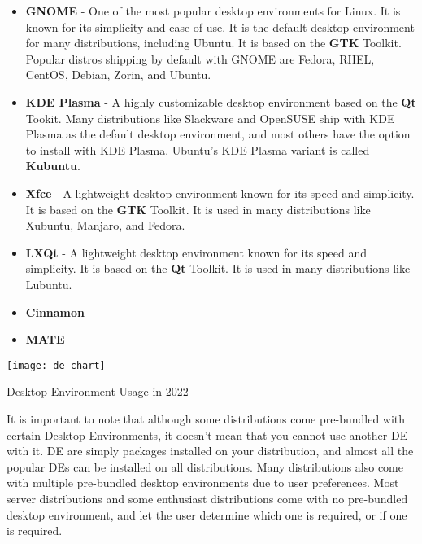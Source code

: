 \begin{itemize}
  \item
    \textbf{GNOME} - One of the most popular desktop environments for Linux. It is known for its simplicity and ease of use. It is the default desktop environment for many distributions, including Ubuntu. It is based on the \textbf{GTK} Toolkit.
    Popular distros shipping by default with GNOME are Fedora, RHEL, CentOS, Debian, Zorin, and Ubuntu.
  \item
    \textbf{KDE Plasma} - A highly customizable desktop environment based on the \textbf{Qt} Tookit.
    Many distributions like Slackware and OpenSUSE ship with KDE Plasma as the default desktop environment, and most others have the option to install with KDE Plasma. Ubuntu's KDE Plasma variant is called \textbf{Kubuntu}.
  \item
    \textbf{Xfce} - A lightweight desktop environment known for its speed and simplicity. It is based on the \textbf{GTK} Toolkit. It is used in many distributions like Xubuntu, Manjaro, and Fedora.
  \item
    \textbf{LXQt} - A lightweight desktop environment known for its speed and simplicity. It is based on the \textbf{Qt} Toolkit. It is used in many distributions like Lubuntu.
  \item
    \textbf{Cinnamon}
  \item
    \textbf{MATE}
\end{itemize}

\begin{marginfigure}
	\texttt{[image: de-chart]}
	\caption[Desktop Environment Usage]{Desktop Environment Usage in 2022}
\end{marginfigure}

It is important to note that although some distributions come pre-bundled with certain Desktop Environments, it doesn't mean that you cannot use another DE with it. DE are simply packages installed on your distribution, and almost all the popular DEs can be installed on all distributions. Many distributions also come with multiple pre-bundled desktop environments due to user preferences. Most server distributions and some enthusiast distributions come with no pre-bundled desktop environment, and let the user determine which one is required, or if one is required.

